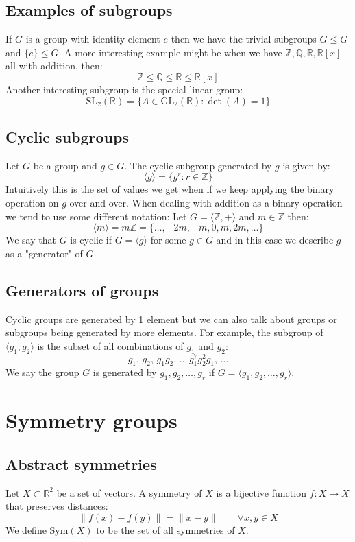 \documentclass[12pt]{article}
\begin{document}
\subsection*{Examples of subgroups}
If \(G\) is a group with identity element \(e\) then we have the trivial subgroups \(G\leqslant G\) and \(\{e\}\leqslant G\). A more interesting example might be when we have \(\mathbb{Z},\mathbb{Q},\mathbb{R},\mathbb{R}[x]\) all with addition, then:
\[\mathbb{Z}\leqslant\mathbb{Q}\leqslant\mathbb{R}\leqslant\mathbb{R}[x]\]
Another interesting subgroup is the special linear group:
\[\text{SL}_2(\mathbb{R})=\{A\in \text{GL}_2(\mathbb{R}):\det(A)=1\}\]
\subsection*{Cyclic subgroups}
Let \(G\) be a group and \(g\in G\). The cyclic subgroup generated by \(g\) is given by:
\[\langle g\rangle=\{g^r:r\in\mathbb{Z}\}\]
Intuitively this is the set of values we get when if we keep applying the binary operation on \(g\) over and over. When dealing with addition as a binary operation we tend to use some different notation: Let \(G=\langle\mathbb{Z},+\rangle\) and \(m\in\mathbb{Z}\) then:
\[\langle m\rangle =m\mathbb{Z}=\{\dots,-2m,-m,0,m,2m,\dots\}\]
We say that \(G\) is cyclic if \(G=\langle g\rangle\) for some \(g\in G\) and in this case we describe \(g\) as a "generator" of \(G\).
\subsection*{Generators of groups}
Cyclic groups are generated by 1 element but we can also talk about groups or subgroups being generated by more elements. For example, the subgroup of \(\langle g_1,g_2\rangle\) is the subset of all combinations of \(g_1\) and \(g_2\):
\[g_1,\,g_2,\,g_1g_2,\,\dots\,g_1^7g_2^2g_1,\,\dots\]
We say the group \(G\) is generated by \(g_1,g_2,\dots, g_r\) if \(G=\langle g_1,g_2,\dots, g_r\rangle\).
\section{Symmetry groups}
\subsection*{Abstract symmetries}
Let \(X\subset\mathbb{R}^2\) be a set of vectors. A symmetry of \(X\) is a bijective function \(f:X\to X\) that preserves distances:
\[\|f(x)-f(y)\|=\|x-y\|\qquad\forall x,y\in X\]
We define \(\text{Sym}(X)\) to be the set of all symmetries of \(X\).
\end{document}
